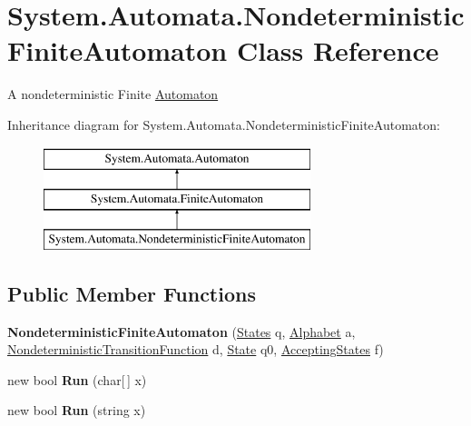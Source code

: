 \hypertarget{class_system_1_1_automata_1_1_nondeterministic_finite_automaton}{}\section{System.\+Automata.\+Nondeterministic\+Finite\+Automaton Class Reference}
\label{class_system_1_1_automata_1_1_nondeterministic_finite_automaton}


A nondeterministic Finite \mbox{\hyperlink{class_system_1_1_automata_1_1_automaton}{Automaton}}  


Inheritance diagram for System.\+Automata.\+Nondeterministic\+Finite\+Automaton\+:\begin{figure}[H]
\begin{center}
\leavevmode
\includegraphics[height=3.000000cm]{class_system_1_1_automata_1_1_nondeterministic_finite_automaton}
\end{center}
\end{figure}
\subsection*{Public Member Functions}
\begin{DoxyCompactItemize}
\item 
\mbox{\label{class_system_1_1_automata_1_1_nondeterministic_finite_automaton_a47356ccfa442fa648fc954a728d8af6b}} 
{\bfseries Nondeterministic\+Finite\+Automaton} (\mbox{\hyperlink{class_system_1_1_automata_1_1_states}{States}} q, \mbox{\hyperlink{class_system_1_1_automata_1_1_alphabet}{Alphabet}} a, \mbox{\hyperlink{class_system_1_1_automata_1_1_nondeterministic_transition_function}{Nondeterministic\+Transition\+Function}} d, \mbox{\hyperlink{class_system_1_1_automata_1_1_state}{State}} q0, \mbox{\hyperlink{class_system_1_1_automata_1_1_accepting_states}{Accepting\+States}} f)
\item 
\mbox{\label{class_system_1_1_automata_1_1_nondeterministic_finite_automaton_a07db23e6e2c3a6e8f8268baa219a053f}} 
new bool {\bfseries Run} (char\mbox{[}$\,$\mbox{]} x)
\item 
\mbox{\label{class_system_1_1_automata_1_1_nondeterministic_finite_automaton_a75de5d0315312f16f00c5dfd825de735}} 
new bool {\bfseries Run} (string x)
\end{DoxyCompactItemize}
